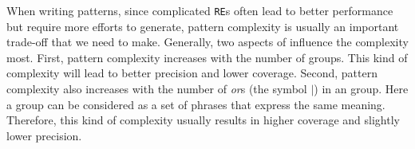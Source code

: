 When writing \RE patterns, since complicated \texttt{RE}s often lead to better performance but require more efforts to generate, pattern complexity is usually an important trade-off that we need to make. Generally, two aspects of \RE influence the complexity most. First, pattern complexity increases with the number of \RE groups. This kind of complexity will lead to better precision and lower coverage. Second, pattern complexity also increases with the number of \emph{or}s (the symbol $|$) in an \RE group. Here a group can be considered as a set of phrases that express the same meaning. Therefore, this kind of complexity usually results in higher coverage and slightly lower precision.

